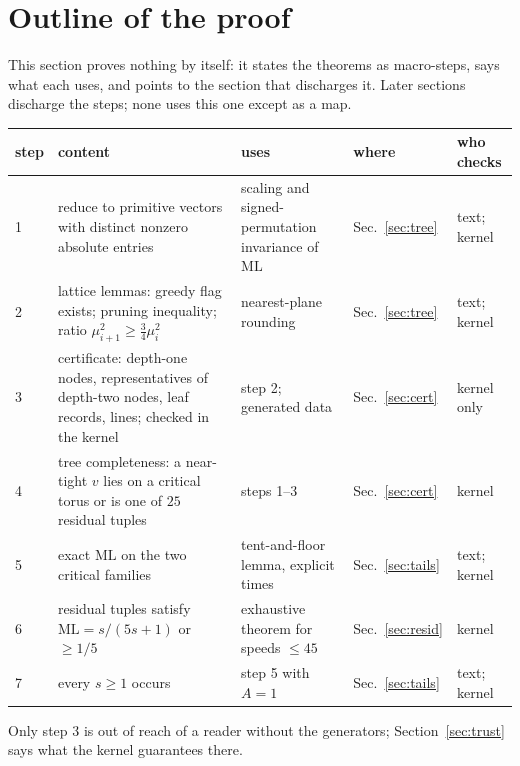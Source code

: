 \documentclass[11pt]{article}
\theoremstyle{remark}
\newcommand{\ML}{\mathrm{ML}}
\begin{document}
\section{Outline of the proof}\label{sec:outline}

This section proves nothing by itself: it states the theorems as macro-steps, says what each uses, and points to the section that discharges it. Later sections discharge the steps; none uses this one except as a map.

\begin{center}
\small
\begin{tabular}{p{1.1cm}p{5.4cm}p{2.9cm}p{1.8cm}p{2.6cm}}
\toprule
step & content & uses & where & who checks\\
\midrule
1 & reduce to primitive vectors with distinct nonzero absolute entries & scaling and signed-permutation invariance of $\ML$ & Sec.~\ref{sec:tree} & text; kernel\\
2 & lattice lemmas: greedy flag exists; pruning inequality; ratio $\mu_{i+1}^2\ge\frac34\mu_i^2$ & nearest-plane rounding & Sec.~\ref{sec:tree} & text; kernel\\
3 & certificate: depth-one nodes, representatives of depth-two nodes, leaf records, lines; checked in the kernel & step 2; generated data & Sec.~\ref{sec:cert} & kernel only\\
4 & tree completeness: a near-tight $v$ lies on a critical torus or is one of $25$ residual tuples & steps 1--3 & Sec.~\ref{sec:cert} & kernel\\
5 & exact $\ML$ on the two critical families & tent-and-floor lemma, explicit times & Sec.~\ref{sec:tails} & text; kernel\\
6 & residual tuples satisfy $\ML=s/(5s+1)$ or $\ge1/5$ & exhaustive theorem for speeds $\le45$ & Sec.~\ref{sec:resid} & kernel\\
7 & every $s\ge1$ occurs & step 5 with $A=1$ & Sec.~\ref{sec:tails} & text; kernel\\
\bottomrule
\end{tabular}
\end{center}
Only step 3 is out of reach of a reader without the generators; Section~\ref{sec:trust} says what the kernel guarantees there.
\end{document}
